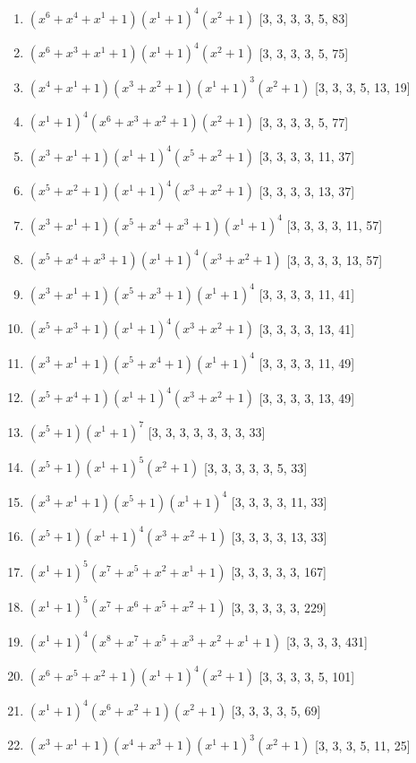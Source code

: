 \documentclass[10pt,twocolumn]{article}
\begin{document}
\begin{enumerate}
\item $(x^{6} + x^{4} + x^{1} + 1)(x^{1} + 1)^{4}(x^{2} + 1)$  [3, 3, 3, 3, 5, 83]
\item $(x^{6} + x^{3} + x^{1} + 1)(x^{1} + 1)^{4}(x^{2} + 1)$  [3, 3, 3, 3, 5, 75]
\item $(x^{4} + x^{1} + 1)(x^{3} + x^{2} + 1)(x^{1} + 1)^{3}(x^{2} + 1)$  [3, 3, 3, 5, 13, 19]
\item $(x^{1} + 1)^{4}(x^{6} + x^{3} + x^{2} + 1)(x^{2} + 1)$  [3, 3, 3, 3, 5, 77]
\item $(x^{3} + x^{1} + 1)(x^{1} + 1)^{4}(x^{5} + x^{2} + 1)$  [3, 3, 3, 3, 11, 37]
\item $(x^{5} + x^{2} + 1)(x^{1} + 1)^{4}(x^{3} + x^{2} + 1)$  [3, 3, 3, 3, 13, 37]
\item $(x^{3} + x^{1} + 1)(x^{5} + x^{4} + x^{3} + 1)(x^{1} + 1)^{4}$  [3, 3, 3, 3, 11, 57]
\item $(x^{5} + x^{4} + x^{3} + 1)(x^{1} + 1)^{4}(x^{3} + x^{2} + 1)$  [3, 3, 3, 3, 13, 57]
\item $(x^{3} + x^{1} + 1)(x^{5} + x^{3} + 1)(x^{1} + 1)^{4}$  [3, 3, 3, 3, 11, 41]
\item $(x^{5} + x^{3} + 1)(x^{1} + 1)^{4}(x^{3} + x^{2} + 1)$  [3, 3, 3, 3, 13, 41]
\item $(x^{3} + x^{1} + 1)(x^{5} + x^{4} + 1)(x^{1} + 1)^{4}$  [3, 3, 3, 3, 11, 49]
\item $(x^{5} + x^{4} + 1)(x^{1} + 1)^{4}(x^{3} + x^{2} + 1)$  [3, 3, 3, 3, 13, 49]
\item $(x^{5} + 1)(x^{1} + 1)^{7}$  [3, 3, 3, 3, 3, 3, 3, 33]
\item $(x^{5} + 1)(x^{1} + 1)^{5}(x^{2} + 1)$  [3, 3, 3, 3, 3, 5, 33]
\item $(x^{3} + x^{1} + 1)(x^{5} + 1)(x^{1} + 1)^{4}$  [3, 3, 3, 3, 11, 33]
\item $(x^{5} + 1)(x^{1} + 1)^{4}(x^{3} + x^{2} + 1)$  [3, 3, 3, 3, 13, 33]
\item $(x^{1} + 1)^{5}(x^{7} + x^{5} + x^{2} + x^{1} + 1)$  [3, 3, 3, 3, 3, 167]
\item $(x^{1} + 1)^{5}(x^{7} + x^{6} + x^{5} + x^{2} + 1)$  [3, 3, 3, 3, 3, 229]
\item $(x^{1} + 1)^{4}(x^{8} + x^{7} + x^{5} + x^{3} + x^{2} + x^{1} + 1)$  [3, 3, 3, 3, 431]
\item $(x^{6} + x^{5} + x^{2} + 1)(x^{1} + 1)^{4}(x^{2} + 1)$  [3, 3, 3, 3, 5, 101]
\item $(x^{1} + 1)^{4}(x^{6} + x^{2} + 1)(x^{2} + 1)$  [3, 3, 3, 3, 5, 69]
\item $(x^{3} + x^{1} + 1)(x^{4} + x^{3} + 1)(x^{1} + 1)^{3}(x^{2} + 1)$  [3, 3, 3, 5, 11, 25]

\end{enumerate}
\end{document}
